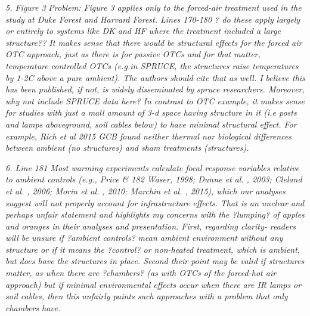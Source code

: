\documentclass[11pt,a4paper]{letter}
\begin{document}
\begin{letter}{}
\emph{5. Figure 3}
\emph{Problem: Figure 3 applies only to the forced-air treatment used in the study at Duke Forest and Harvard Forest. Lines 170-180 ? do these apply largely or entirely to systems like DK and HF where the treatment included a large structure?? It makes sense that there would be structural effects for the forced air OTC approach, just as there is for passive OTCs and for that matter, temperature controlled OTCs (e.g.in SPRUCE, the structures raise temperatures by 1-2C above a pure ambient). The authors should cite that as well. I believe this has been published, if not, is widely disseminated by spruce researchers. Moreover, why not include SPRUCE data here? In contrast to OTC example, it makes sense for studies with just a  mall amount of 3-d space having structure in it (i.e posts and lamps aboveground, soil cables below) to have minimal structural effect. For example, Rich et al 2015 GCB found neither thermal nor biological differences between ambient (no structures) and sham treatments (structures).}

\emph{6. Line 181 Most warming experiments calculate focal response variables relative to ambient controls (e.g., Price &
182 Waser, 1998; Dunne et al. , 2003; Cleland et al. , 2006; Morin et al. , 2010; Marchin et al. , 2015), which our analyses suggest will not properly account for infrastructure effects.}
\emph{That is an unclear and perhaps unfair statement and highlights my concerns with the ?lumping? of apples and oranges in their analyses and presentation. First, regarding clarity- readers will be unsure if ?ambient controls? mean ambient environment without any structure or if it means the ?control? or non-heated treatment, which is ambient, but does have the structures in place. Second their point may be valid if structures matter, as when there are ?chambers? (as with OTCs of the forced-hot air approach) but if minimal environmental effects occur when there are IR lamps or soil cables, then this unfairly paints such approaches with a problem that only chambers have.}


\end{letter}
\end{document}
